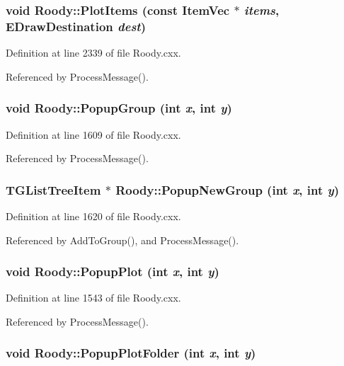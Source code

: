 \subsubsection[{PlotItems}]{\setlength{\rightskip}{0pt plus 5cm}void Roody::PlotItems (const {\bf ItemVec} $\ast$ {\em items}, \/  {\bf EDrawDestination} {\em dest})\hspace{0.3cm}{\ttfamily  [private]}}\label{classRoody_aa64de3d1055473189bb2c783c1d5875f}


Definition at line 2339 of file Roody.cxx.

Referenced by ProcessMessage().
\subsubsection[{PopupGroup}]{\setlength{\rightskip}{0pt plus 5cm}void Roody::PopupGroup (int {\em x}, \/  int {\em y})}\label{classRoody_a2982d01308bd9996cb468fec51137caa}


Definition at line 1609 of file Roody.cxx.

Referenced by ProcessMessage().
\subsubsection[{PopupNewGroup}]{\setlength{\rightskip}{0pt plus 5cm}TGListTreeItem $\ast$ Roody::PopupNewGroup (int {\em x}, \/  int {\em y})}\label{classRoody_ae4d661108b7badd29d40649decb5ffdc}


Definition at line 1620 of file Roody.cxx.

Referenced by AddToGroup(), and ProcessMessage().
\subsubsection[{PopupPlot}]{\setlength{\rightskip}{0pt plus 5cm}void Roody::PopupPlot (int {\em x}, \/  int {\em y})}\label{classRoody_ae0b44c0d728de875cb271e82e5ada792}


Definition at line 1543 of file Roody.cxx.

Referenced by ProcessMessage().
\subsubsection[{PopupPlotFolder}]{\setlength{\rightskip}{0pt plus 5cm}void Roody::PopupPlotFolder (int {\em x}, \/  int {\em y})}\label{classRoody_a346a1a52e0a4568bffac68a200fdf2e8}


